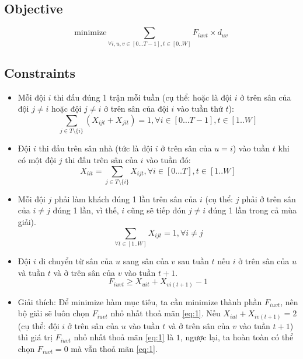 \documentclass{article}
\begin{document}
\subsection{Objective}
\begin{equation}
    \text{minimize} \sum_{\forall i, u, v \in [0\ldots T-1], t\in [0..W]} F_{iuvt} \times d_{uv}
\end{equation}

\subsection{Constraints}
\begin{itemize}
    \item Mỗi đội $i$ thi đấu đúng 1 trận mỗi tuần (cụ thể: hoặc là đội $i$ ở trên sân của đội $j \ne i$ hoặc đội $j \ne i$ ở trên sân của đội $i$ vào tuần thứ $t$):
    \begin{equation}
        \sum_{j \in T\setminus \{i\}} (X_{ijt} + X_{jit}) = 1, \forall i \in [0\ldots  T-1], t \in [1..W]
    \end{equation}
    \item Đội $i$ thi đấu trên sân nhà (tức là đội $i$ ở trên sân của $u = i$) vào tuần $t$ khi có một đội $j$ thi đấu trên sân của $i$ vào tuần đó:
    \begin{equation}
        X_{iit} = \sum_{j\in T\setminus \{i\}} X_{ijt}, \forall i \in [0\ldots T], t \in [1..W]
    \end{equation}
    \item Mỗi đội $j$ phải làm khách đúng 1 lần trên sân của $i$ (cụ thể: $j$ phải ở trên sân của $i \ne j$ đúng 1 lần, vì thế, $i$ cũng sẽ tiếp đón $j \ne i$ đúng 1 lần trong cả mùa giải).
    \begin{equation}
        \sum_{\forall t \in [1..W]} X_{ijt} = 1, \forall i \ne j
    \end{equation}
    \item Đội $i$ di chuyển từ sân của $u$ sang sân của $v$ sau tuần $t$ nếu $i$ ở trên sân của $u$ và tuần $t$ và ở trên sân của $v$ vào tuần $t+1$.
    \begin{equation}
        F_{iuvt} \geq X_{uit} + X_{vi(t+1)} - 1 \label{eq:1}
    \end{equation}
    \item Giải thích: Để minimize hàm mục tiêu, ta cần minimize thành phần $F_{iuvt}$, nên bộ giải sẽ luôn chọn $F_{iuvt}$ nhỏ nhất thoả mãn \eqref{eq:1}. Nếu $X_{iut} + X_{iv(t+1)} = 2$ (cụ thể: đội $i$ ở trên sân của $u$ vào tuần $t$ và ở trên sân của $v$ vào tuần $t+1$) thì giá trị $F_{iuvt}$ nhỏ nhất thoả mãn \eqref{eq:1} là $1$, ngược lại, ta hoàn toàn có thể chọn $F_{iuvt} = 0$ mà vẫn thoả mãn \eqref{eq:1}.
\end{itemize}
\end{document}
